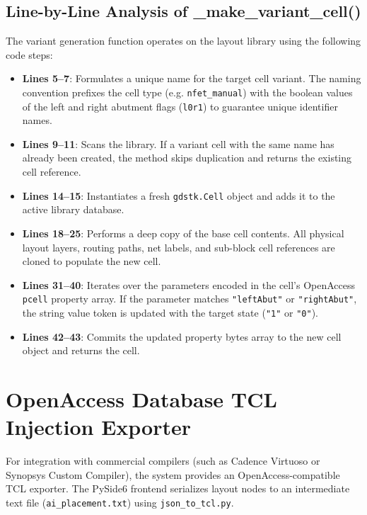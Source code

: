 \subsection{Line-by-Line Analysis of \_make\_variant\_cell()}
The variant generation function operates on the layout library using the following code steps:
\begin{itemize}
    \item \textbf{Lines 5--7}: Formulates a unique name for the target cell variant. The naming convention prefixes the cell type (e.g. \texttt{nfet\_manual}) with the boolean values of the left and right abutment flags (\texttt{l0r1}) to guarantee unique identifier names.
    \item \textbf{Lines 9--11}: Scans the library. If a variant cell with the same name has already been created, the method skips duplication and returns the existing cell reference.
    \item \textbf{Lines 14--15}: Instantiates a fresh \texttt{gdstk.Cell} object and adds it to the active library database.
    \item \textbf{Lines 18--25}: Performs a deep copy of the base cell contents. All physical layout layers, routing paths, net labels, and sub-block cell references are cloned to populate the new cell.
    \item \textbf{Lines 31--40}: Iterates over the parameters encoded in the cell's OpenAccess \texttt{pcell} property array. If the parameter matches \texttt{"leftAbut"} or \texttt{"rightAbut"}, the string value token is updated with the target state (\texttt{"1"} or \texttt{"0"}).
    \item \textbf{Lines 42--43}: Commits the updated property bytes array to the new cell object and returns the cell.
\end{itemize}

\section[OpenAccess TCL Exporter]{OpenAccess Database TCL Injection Exporter}
\label{sec:tcl_exporter}

For integration with commercial compilers (such as Cadence Virtuoso or Synopsys Custom Compiler), the system provides an OpenAccess-compatible TCL exporter. The PySide6 frontend serializes layout nodes to an intermediate text file (\texttt{ai\_placement.txt}) using \texttt{json\_to\_tcl.py}. 

